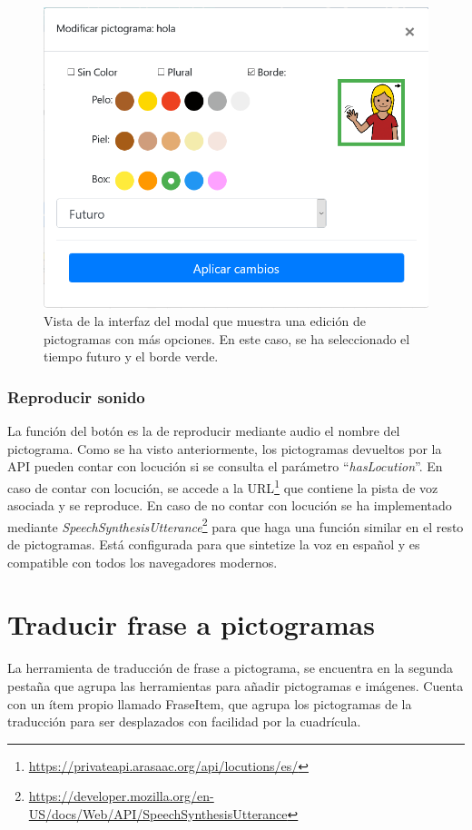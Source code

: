 \begin{figure}[h!]
	\centering
	\includegraphics[width=0.7\linewidth]{Imagenes/Bitmap/modalEditarPicto}
	\caption{Vista de la interfaz del modal que muestra una edición de pictogramas con más opciones. En este caso, se ha seleccionado el tiempo futuro y el borde verde. }
	\label{fig:modaleditarpicto}
\end{figure}


\subsubsection{Reproducir sonido}


La función del botón es la de reproducir mediante audio el nombre del pictograma. Como se ha visto anteriormente, los pictogramas devueltos por la API pueden contar con locución si se consulta el parámetro “\textit{hasLocution}”. En caso de contar con locución, se accede a la URL\footnote{\url{https://privateapi.arasaac.org/api/locutions/es/}} que contiene la pista de voz asociada y se reproduce. 
En caso de no contar con locución se ha implementado mediante \textit{SpeechSynthesisUtterance}\footnote{\url{https://developer.mozilla.org/en-US/docs/Web/API/SpeechSynthesisUtterance}} para que haga una función similar en el resto de pictogramas. Está configurada para que sintetize la voz en español y es compatible con todos los navegadores modernos.


\section{Traducir frase a pictogramas}

La herramienta de traducción de frase a pictograma, se encuentra en la segunda pestaña que agrupa las herramientas para añadir pictogramas e imágenes. Cuenta con un ítem propio llamado FraseItem, que agrupa los pictogramas de la traducción para ser desplazados con facilidad  por la cuadrícula.

